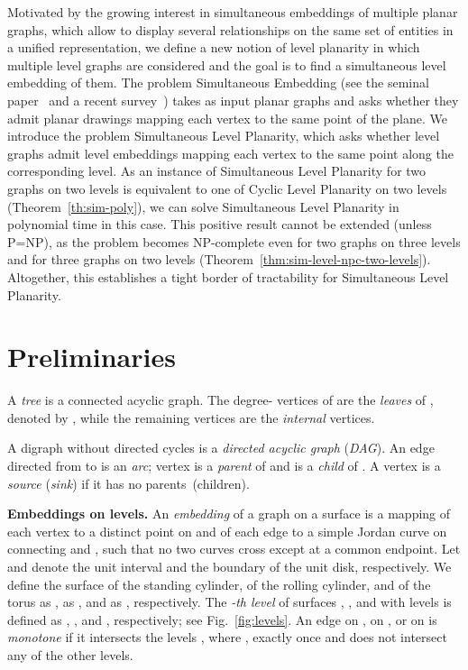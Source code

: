 \documentclass{llncs}
\newcommand{\NPC}{\mbox{NP-complete}\xspace}
\begin{document}
Motivated by the growing interest in simultaneous embeddings of multiple planar graphs, which allow to display several relationships on the same set of entities in a unified representation, we define a new notion of level planarity in which multiple level graphs are considered and the goal is to find a simultaneous level embedding of them. 
The problem {\sc Simultaneous Embedding} (see the seminal paper~\cite{bcdeeiklm-spge-07} and a recent survey~\cite{bkr-sepg-13}) takes as input  planar graphs  and asks whether they admit planar drawings mapping each vertex to the same point of the plane. We introduce the problem {\sc Simultaneous Level Planarity}, which asks whether  level graphs  admit level embeddings mapping each vertex to the same point along the corresponding level.
As an instance of {\sc Simultaneous Level Planarity} for two graphs on two levels is equivalent to one of {\sc Cyclic Level Planarity} on two levels (Theorem~\ref{th:sim-poly}), we can solve {\sc Simultaneous Level Planarity} in polynomial time in this case. This positive result cannot be extended (unless P=NP), as the problem becomes \NPC even for two graphs on three levels and for three graphs on two levels (Theorem~\ref{thm:sim-level-npc-two-levels}). Altogether, this establishes a tight border of tractability for {\sc Simultaneous Level Planarity}.


\section{Preliminaries} \label{se:preliminaries}

A {\em tree}  is a connected acyclic graph. The degree- vertices of  are the {\em leaves} of , denoted by , while the remaining vertices are the {\em internal} vertices. 

A digraph  without directed cycles is a {\em directed acyclic graph} ({\em DAG}). 
An edge  directed from  to  is an \emph{arc}; vertex  is a {\em parent} of  and  is a {\em child} of .
A vertex is a {\em source} ({\em sink}) if it has no parents~(children).

\smallskip
\noindent
{\bf Embeddings on levels.} 
An {\em embedding} of a graph on a surface  is a mapping  of each vertex  to a distinct point on  and of each edge  to a simple Jordan curve on  connecting  and , such that no two curves cross except at a common endpoint. 
Let  and  denote the unit interval and the boundary of the unit disk, respectively.
We define the surface  of the standing cylinder,  of the rolling cylinder, and  of the torus
as ,
as , and 
as , respectively.
The {\em -th level} of surfaces , , and  with  levels is defined as
 ,
  , and
 , respectively; see Fig.~\ref{fig:levels}.
An edge  on , on , or on  is {\em monotone} if it intersects the levels , where , exactly once and does not intersect any of the other levels.
\end{document}
